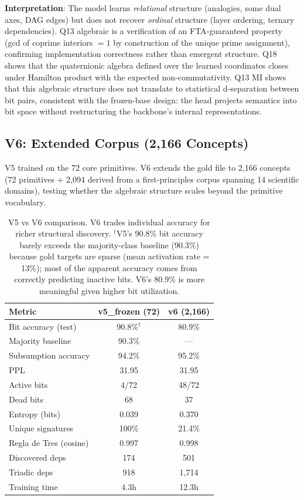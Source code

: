\documentclass[11pt, a4paper]{article}
\begin{document}
\noindent\textbf{Interpretation}: The model learns \emph{relational} structure (analogies, some dual axes, DAG edges) but does not recover \emph{ordinal} structure (layer ordering, ternary dependencies). Q13 algebraic is a verification of an FTA-guaranteed property (gcd of coprime interiors $=1$ by construction of the unique prime assignment), confirming implementation correctness rather than emergent structure. Q18 shows that the quaternionic algebra defined over the learned coordinates closes under Hamilton product with the expected non-commutativity. Q13 MI shows that this algebraic structure does not translate to statistical d-separation between bit pairs, consistent with the frozen-base design: the head projects semantics into bit space without restructuring the backbone's internal representations.

\subsection{V6: Extended Corpus (2{,}166 Concepts)}

V5 trained on the 72 core primitives. V6 extends the gold file to 2{,}166 concepts (72 primitives + 2{,}094 derived from a first-principles corpus spanning 14 scientific domains), testing whether the algebraic structure scales beyond the primitive vocabulary.

\begin{table}[ht]
\centering
\small
\begin{tabular}{lcc}
\toprule
\textbf{Metric} & \textbf{v5\_frozen (72)} & \textbf{v6 (2{,}166)} \\
\midrule
Bit accuracy (test)    & 90.8\%$^\dagger$  & 80.9\% \\
Majority baseline      & 90.3\%  & --- \\
Subsumption accuracy   & 94.2\%  & 95.2\% \\
PPL                    & 31.95   & 31.95 \\
Active bits            & 4/72    & 48/72 \\
Dead bits              & 68      & 37 \\
Entropy (bits)         & 0.039   & 0.370 \\
Unique signatures      & 100\%   & 21.4\% \\
Regla de Tres (cosine) & 0.997   & 0.998 \\
Discovered deps        & 174     & 501 \\
Triadic deps           & 918     & 1{,}714 \\
Training time          & 4.3h    & 12.3h \\
\bottomrule
\end{tabular}
\caption{V5 vs V6 comparison. V6 trades individual accuracy for richer structural discovery. $^\dagger$V5's 90.8\% bit accuracy barely exceeds the majority-class baseline (90.3\%) because gold targets are sparse (mean activation rate = 13\%); most of the apparent accuracy comes from correctly predicting inactive bits. V6's 80.9\% is more meaningful given higher bit utilization.}
\label{tab:v6}
\end{table}
\end{document}
